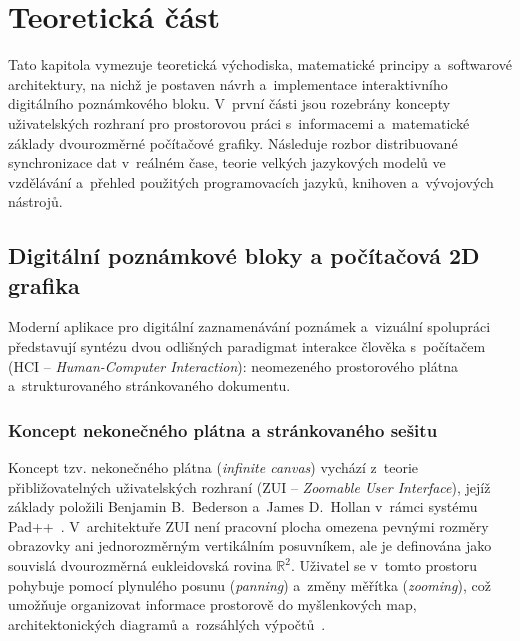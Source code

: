 \documentclass[12pt, a4paper, oneside]{article}
\begin{document}
\section{Teoretická část}
\label{sec:teorie}

Tato kapitola vymezuje teoretická východiska, matematické principy a~softwarové architektury, na nichž je postaven návrh a~implementace interaktivního digitálního poznámkového bloku. V~první části jsou rozebrány koncepty uživatelských rozhraní pro prostorovou práci s~informacemi a~matematické základy dvourozměrné počítačové grafiky. Následuje rozbor distribuované synchronizace dat v~reálném čase, teorie velkých jazykových modelů ve vzdělávání a~přehled použitých programovacích jazyků, knihoven a~vývojových nástrojů.

\subsection{Digitální poznámkové bloky a počítačová 2D grafika}
\label{sec:teorie_grafika}

Moderní aplikace pro digitální zaznamenávání poznámek a~vizuální spolupráci představují syntézu dvou odlišných paradigmat interakce člověka s~počítačem (HCI -- \textit{Human-Computer Interaction}): neomezeného prostorového plátna a~strukturovaného stránkovaného dokumentu.

\subsubsection{Koncept nekonečného plátna a stránkovaného sešitu}
\label{sec:teorie_zui}

Koncept tzv. nekonečného plátna (\textit{infinite canvas}) vychází z~teorie přibližovatelných uživatelských rozhraní (ZUI -- \textit{Zoomable User Interface}), jejíž základy položili Benjamin B.~Bederson a~James D.~Hollan v~rámci systému Pad++~\cite{bederson1994pad}. V~architektuře ZUI není pracovní plocha omezena pevnými rozměry obrazovky ani jednorozměrným vertikálním posuvníkem, ale je definována jako souvislá dvourozměrná eukleidovská rovina $\mathbb{R}^2$. Uživatel se v~tomto prostoru pohybuje pomocí plynulého posunu (\textit{panning}) a~změny měřítka (\textit{zooming}), což umožňuje organizovat informace prostorově do myšlenkových map, architektonických diagramů a~rozsáhlých výpočtů~\cite{bederson1994pad}.
\end{document}
